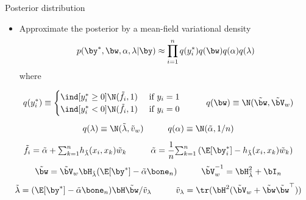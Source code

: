 \begin{frame}{Posterior distribution}
  \begin{itemize}
    \item Approximate the posterior by a mean-field variational density
    \[
      p(\by^*,\bw,\alpha,\lambda|\by) \approx \prod_{i=1}^n q(y_i^*)q(\bw)q(\alpha)q(\lambda)\vspace{-2pt}
    \]
    where
  \end{itemize}
  \vspace{-15pt}
  \begin{center}   
    \begin{gather*}
      q(y_i^*) \equiv 
      \begin{cases}
        \ind[y_i^* \geq 0] \N(\tilde f_i, 1) &\text{ if } y_i = 1\\
        \ind[y_i^* < 0] \N(\tilde f_i, 1) &\text{ if } y_i = 0\\
      \end{cases}
    \hspace{1cm}
    q(\bw) \equiv \N(\tilde\bw, \tilde\bV_w) \\[0.5em]
    q(\lambda) \equiv \N(\tilde\lambda, \tilde v_w)
    \hspace{1cm}  
    q(\alpha) \equiv \N(\tilde\alpha,1/n) \\[0.5em]
    \tilde f_i = \tilde\alpha + {\textstyle\sum_{k=1}^n} h_{\tilde\lambda}(x_i, x_k)\tilde w_k 
    \hspace{1cm} 
    \tilde\alpha = \frac{1}{n}{\textstyle\sum_{k=1}^n} \left( \E[\by^*_i] - h_{\tilde\lambda}(x_i, x_k)\tilde w_k \right) \\[0.3em]
    \tilde \bw = \tilde\bV_w\bH_{\tilde\lambda}(\E[\by^*] - \tilde\alpha\bone_n)
    \hspace{1cm} 
    \tilde\bV_w^{-1} = \bH_{\tilde\lambda}^2 + \bI_n \\[0.3em]
    \tilde\lambda = (\E[\by^*] - \tilde\alpha\bone_n)\bH\tilde\bw / \tilde v_\lambda
    \hspace{1cm} 
    \tilde v_\lambda = \tr(\bH^2(\tilde\bV_w + \tilde\bw\tilde\bw^\top))
    \end{gather*}
  \end{center} 
\end{frame}

